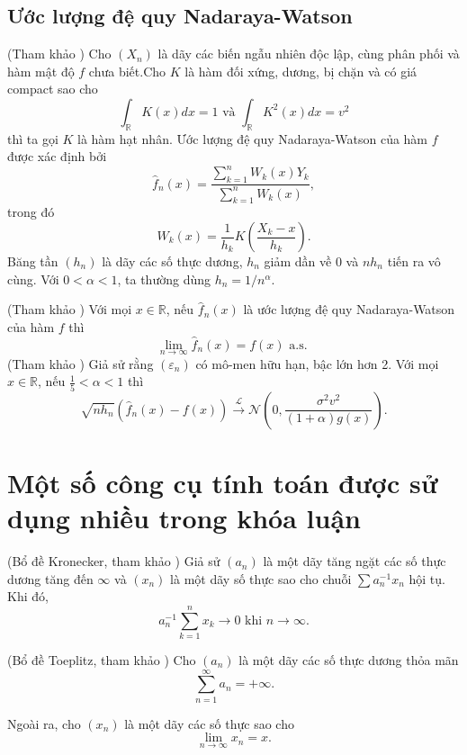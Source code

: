 \subsection{Ước lượng đệ quy Nadaraya-Watson}
{\dn(Tham khảo \cite{noda}) Cho $\left(X_n\right)$ là dãy các biến ngẫu nhiên độc lập, cùng phân phối và hàm mật độ $f$ chưa biết.Cho $K$ là hàm đối xứng, dương, bị chặn và có giá compact sao cho
$$
\int_{\mathbb{R}} K(x) d x=1 \text { và } \int_{\mathbb{R}} K^2(x) d x=v^2
$$
thì ta gọi $K$ là hàm hạt nhân.
\noindent Ước lượng đệ quy Nadaraya-Watson của hàm $f$ được xác định bởi
$$
\hat{f}_n(x)=\frac{\sum_{k=1}^n W_k(x) Y_k}{\sum_{k=1}^n W_k(x)},
$$
trong đó
$$
W_k(x)=\frac{1}{h_k} K\left(\frac{X_k-x}{h_k}\right) .
$$
Băng tần $\left(h_n\right)$ là dãy các số thực dương, $h_n$ giảm dần về 0 và $n h_n$ tiến ra vô cùng. Với $0<\alpha<1$, ta thường dùng $h_n=1 / n^\alpha$.

{\dl (Tham khảo \cite{noda}) Với mọi $x \in \mathbb{R}$, nếu $\hat{f}_n(x)$ là ước lượng đệ quy Nadaraya-Watson của hàm $f$ thì
$$
\lim _{n \rightarrow \infty} \hat{f}_n(x)=f(x) \text { a.s. }
$$}
{\dl (Tham khảo \cite{schuster}) Giả sử rằng $\left(\varepsilon_n\right)$ có mô-men hữu hạn, bậc lớn hơn 2. Với mọi $x \in \mathbb{R}$, nếu $\frac{1}{5}<\alpha<1$ thì
$$
\sqrt{n h_n}\left(\hat{f}_n(x)-f(x)\right) \xrightarrow{\mathcal{L}} \mathcal{N}\left(0, \frac{\sigma^2 v^2}{(1+\alpha) g(x)}\right) .
$$
}
\section{Một số công cụ tính toán được sử dụng nhiều trong khóa luận}
{\bd (Bổ đề Kronecker, tham khảo \cite{duflo}) Giả sử $\left(a_n\right)$ là một dãy tăng ngặt các số thực dương tăng đến $\infty$ và $\left(x_n\right)$ là một dãy số thực sao cho chuỗi $\sum a_n^{-1} x_n$ hội tụ. Khi đó,
$$
a_n^{-1} \sum_{k=1}^n x_k \rightarrow 0 \text { khi } n \rightarrow \infty.
$$}

{\bd (Bổ đề Toeplitz, tham khảo \cite{duflo}) Cho $\left(a_n\right)$ là một dãy các số thực dương thỏa mãn
$$
\sum_{n=1}^{\infty} a_n=+\infty .
$$

Ngoài ra, cho $\left(x_n\right)$ là một dãy các số thực sao cho
$$
\lim _{n \rightarrow \infty} x_n=x .
$$

}}
